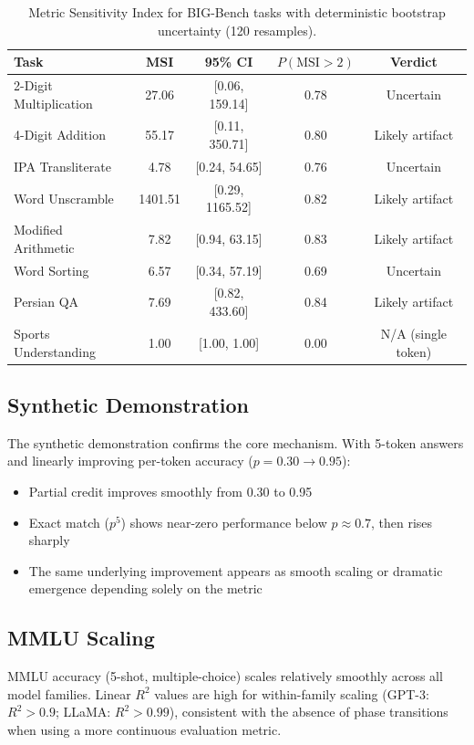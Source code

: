 \documentclass[11pt,a4paper]{article}
\begin{document}
\begin{table}[h]
\centering
\caption{Metric Sensitivity Index for BIG-Bench tasks with deterministic bootstrap uncertainty (120 resamples).}
\label{tab:msi}
\begin{tabular}{lcccc}
\toprule
\textbf{Task} & \textbf{MSI} & \textbf{95\% CI} & \textbf{$P(\text{MSI}>2)$} & \textbf{Verdict} \\
\midrule
2-Digit Multiplication & 27.06 & [0.06, 159.14] & 0.78 & Uncertain \\
4-Digit Addition & 55.17 & [0.11, 350.71] & 0.80 & Likely artifact \\
IPA Transliterate & 4.78 & [0.24, 54.65] & 0.76 & Uncertain \\
Word Unscramble & 1401.51 & [0.29, 1165.52] & 0.82 & Likely artifact \\
Modified Arithmetic & 7.82 & [0.94, 63.15] & 0.83 & Likely artifact \\
Word Sorting & 6.57 & [0.34, 57.19] & 0.69 & Uncertain \\
Persian QA & 7.69 & [0.82, 433.60] & 0.84 & Likely artifact \\
Sports Understanding & 1.00 & [1.00, 1.00] & 0.00 & N/A (single token) \\
\bottomrule
\end{tabular}
\end{table}

\subsection{Synthetic Demonstration}

The synthetic demonstration confirms the core mechanism. With 5-token answers and linearly improving per-token accuracy ($p = 0.30 \to 0.95$):
\begin{itemize}
    \item Partial credit improves smoothly from 0.30 to 0.95
    \item Exact match ($p^5$) shows near-zero performance below $p \approx 0.7$, then rises sharply
    \item The same underlying improvement appears as smooth scaling or dramatic emergence depending solely on the metric
\end{itemize}

\subsection{MMLU Scaling}

MMLU accuracy (5-shot, multiple-choice) scales relatively smoothly across all model families. Linear $R^2$ values are high for within-family scaling (GPT-3: $R^2 > 0.9$; LLaMA: $R^2 > 0.99$), consistent with the absence of phase transitions when using a more continuous evaluation metric.
\end{document}
